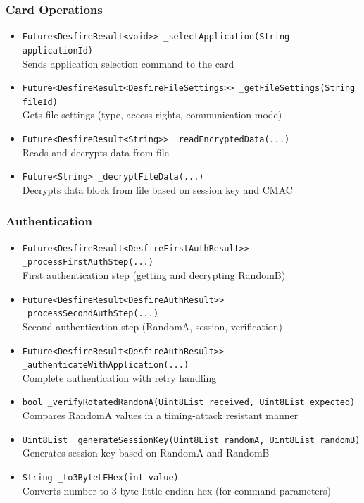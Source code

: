 \documentclass[a4paper,12pt]{article}
\begin{document}
\subsubsection*{Card Operations}
\begin{itemize}
    \item \texttt{Future<DesfireResult<void>> \_selectApplication(String applicationId)}\\
    Sends application selection command to the card
    
    \item \texttt{Future<DesfireResult<DesfireFileSettings>> \_getFileSettings(String fileId)}\\
    Gets file settings (type, access rights, communication mode)
    
    \item \texttt{Future<DesfireResult<String>> \_readEncryptedData(...)}\\
    Reads and decrypts data from file
    
    \item \texttt{Future<String> \_decryptFileData(...)}\\
    Decrypts data block from file based on session key and CMAC
\end{itemize}

\subsubsection*{Authentication}
\begin{itemize}
    \item \texttt{Future<DesfireResult<DesfireFirstAuthResult>> \_processFirstAuthStep(...)}\\
    First authentication step (getting and decrypting RandomB)
    
    \item \texttt{Future<DesfireResult<DesfireAuthResult>> \_processSecondAuthStep(...)}\\
    Second authentication step (RandomA, session, verification)
    
    \item \texttt{Future<DesfireResult<DesfireAuthResult>> \_authenticateWithApplication(...)}\\
    Complete authentication with retry handling
    
    \item \texttt{bool \_verifyRotatedRandomA(Uint8List received, Uint8List expected)}\\
    Compares RandomA values in a timing-attack resistant manner
    
    \item \texttt{Uint8List \_generateSessionKey(Uint8List randomA, Uint8List randomB)}\\
    Generates session key based on RandomA and RandomB
    
    \item \texttt{String \_to3ByteLEHex(int value)}\\
    Converts number to 3-byte little-endian hex (for command parameters)
\end{itemize}
\end{document}
